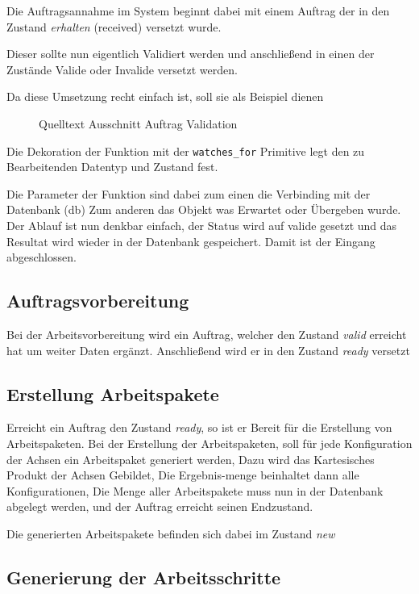 \FloatBarrier
Die Auftragsannahme im System beginnt dabei mit einem Auftrag der in den Zustand \textit{erhalten} (received) versetzt wurde.

Dieser sollte nun eigentlich Validiert werden und anschließend in einen der Zustände Valide oder Invalide versetzt werden.

Da diese Umsetzung recht einfach ist, soll sie als Beispiel dienen
\begin{figure}[h]
\caption{Quelltext Ausschnitt Auftrag Validation}
\label{fig:auftrag-validation-code}
\end{figure}

Die Dekoration \cite{python:decorator}
der Funktion mit der \verb|watches_for| Primitive legt den zu Bearbeitenden Datentyp und Zustand fest.

Die Parameter der Funktion sind dabei zum einen die Verbinding mit der Datenbank
 (db)
Zum anderen das Objekt was Erwartet oder Übergeben wurde.
Der Ablauf ist nun denkbar einfach, der Status wird auf valide gesetzt und das Resultat wird wieder in der Datenbank gespeichert.
Damit ist der Eingang abgeschlossen.

\FloatBarrier
\subsection{Auftragsvorbereitung}

Bei der Arbeitsvorbereitung wird ein Auftrag,
welcher den Zustand \textit{valid} erreicht hat um weiter Daten ergänzt.
Anschließend wird er in den Zustand \textit{ready} versetzt

\subsection{Erstellung Arbeitspakete}

Erreicht ein Auftrag den Zustand \textit{ready}, so ist er Bereit für die Erstellung von Arbeitspaketen.
Bei der Erstellung der Arbeitspaketen, soll für jede Konfiguration der Achsen ein Arbeitspaket generiert werden,
Dazu wird das Kartesisches Produkt der Achsen Gebildet,
Die Ergebnis-menge beinhaltet dann alle Konfigurationen,
Die Menge aller Arbeitspakete muss nun in der Datenbank abgelegt werden,
und der Auftrag erreicht seinen Endzustand.

Die generierten Arbeitspakete befinden sich dabei im Zustand \textit{new}

\subsection{Generierung der Arbeitsschritte}

